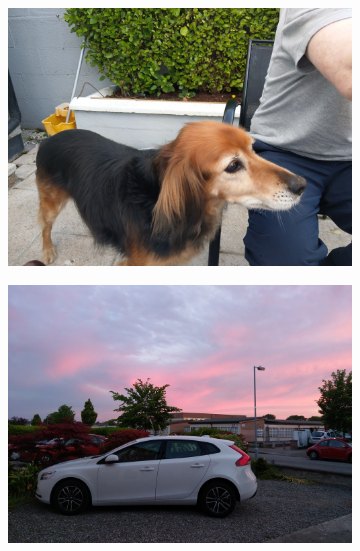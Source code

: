   \begin{figure}[H]
    \centering
    \captionsetup{justification=centering}
  
    \begin{subfigure}{0.35\textwidth}
    \includegraphics[width=\textwidth]{Sections/4InitialWork/4_images/run1_pic.jpg}
    \caption{} 
    \end{subfigure}
    \begin{subfigure}{0.35\textwidth}
    \includegraphics[width=\textwidth]{Sections/4InitialWork/4_images/run3_pic.jpg}
    \caption{} 
  \end{subfigure}
    \begin{subfigure}{0.1968\textwidth}

\end{subfigure}
\end{figure}
